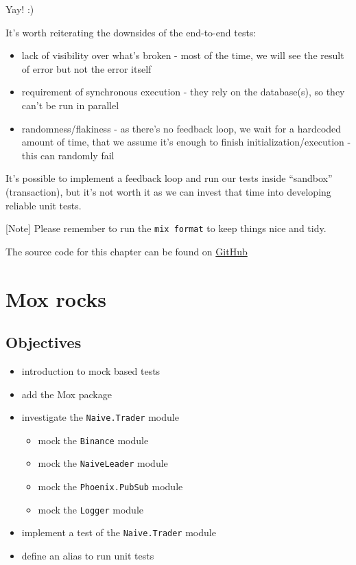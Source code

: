 \documentclass[
  oneside]{book}
\providecommand{\tightlist}{%
  \setlength{\itemsep}{0pt}\setlength{\parskip}{0pt}}
\begin{document}
Yay! :)

It's worth reiterating the downsides of the end-to-end tests:

\begin{itemize}
\tightlist
\item
  lack of visibility over what's broken - most of the time, we will see the result of error but not the error itself
\item
  requirement of synchronous execution - they rely on the database(s), so they can't be run in parallel
\item
  randomness/flakiness - as there's no feedback loop, we wait for a hardcoded amount of time, that we assume it's enough to finish initialization/execution - this can randomly fail
\end{itemize}

It's possible to implement a feedback loop and run our tests inside ``sandbox'' (transaction), but it's not worth it as we can invest that time into developing reliable unit tests.

{[}Note{]} Please remember to run the \texttt{mix\ format} to keep things nice and tidy.

The source code for this chapter can be found on \href{https://github.com/Cinderella-Man/hands-on-elixir-and-otp-cryptocurrency-trading-bot-source-code/tree/chapter_16}{GitHub}

\chapter{Mox rocks}\label{mox-rocks}

\section{Objectives}\label{objectives-16}

\begin{itemize}
\tightlist
\item
  introduction to mock based tests
\item
  add the Mox package
\item
  investigate the \texttt{Naive.Trader} module

  \begin{itemize}
  \tightlist
  \item
    mock the \texttt{Binance} module
  \item
    mock the \texttt{NaiveLeader} module
  \item
    mock the \texttt{Phoenix.PubSub} module
  \item
    mock the \texttt{Logger} module
  \end{itemize}
\item
  implement a test of the \texttt{Naive.Trader} module
\item
  define an alias to run unit tests
\end{itemize}
\end{document}
